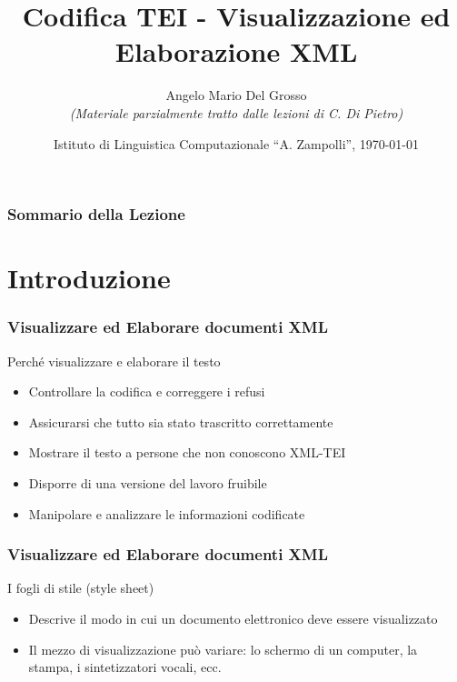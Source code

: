 \documentclass{beamer}
\title{Codifica TEI - Visualizzazione ed Elaborazione XML}
\author[A.M. Del Grosso]{Angelo Mario Del Grosso \\ \tiny\textit{(Materiale parzialmente tratto dalle lezioni di C. Di Pietro)}}
\institute{\texttt{angelo.delgrosso@ilc.cnr.it} \\\textit{CNR-ILC-LicoLab} \\\url{http://licolab.ilc.cnr.it/}}
\date{Istituto di Linguistica Computazionale ``A. Zampolli'', \today}
\begin{document}
    
    \begin{frame}
        \maketitle
    \end{frame}
    
    \begin{frame}
        \frametitle{Sommario della Lezione}
        \tableofcontents
    \end{frame}
    
    \section{Introduzione}
    
    \begin{frame}
        \frametitle{Visualizzare ed Elaborare documenti XML}
        \addtocounter{nframe}{1}
        

         \begin{block}{Perché visualizzare e elaborare il testo}
             \begin{itemize}
                \item Controllare la codifica e correggere i refusi
                \item Assicurarsi che tutto sia stato trascritto correttamente
                \item Mostrare il testo a persone che non conoscono XML-TEI
                \item Disporre di una versione del lavoro fruibile
                \item Manipolare e analizzare le informazioni codificate
            \end{itemize}
         \end{block}
        
    \end{frame}
    
    \begin{frame}
        \frametitle{Visualizzare ed Elaborare documenti XML}
        \addtocounter{nframe}{1}
        
        \begin{block}{I fogli di stile (style sheet)}
           \begin{itemize}
               \item Descrive il modo in cui un documento elettronico deve essere visualizzato
               \item Il mezzo di visualizzazione può variare: lo schermo di un computer, la stampa, i sintetizzatori vocali, ecc.
           \end{itemize}
        \end{block}
        
    \end{frame}
\end{document}
